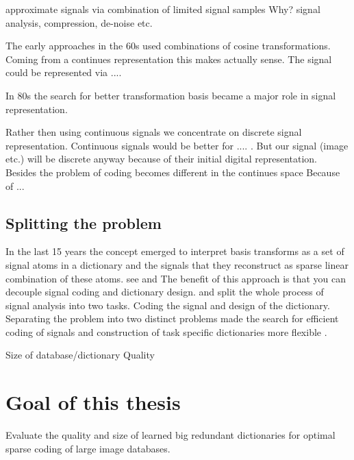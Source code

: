 approximate signals via combination of limited signal samples
Why?
signal analysis, compression, de-noise etc.

The early approaches in the 60s used combinations of cosine transformations. Coming from a continues representation this makes 
actually sense. The signal could be represented via ....

In 80s the search for better transformation basis became a major role in signal representation. \cite{}

Rather then using continuous signals we concentrate on discrete signal representation.
Continuous signals would be better for .... . But our signal (image etc.) will be discrete anyway because of their initial digital representation. 
Besides the problem of coding becomes different in the continues space \cite{} Because of ...

\subsection{Splitting the problem}
\cite{Rubinstein2010}
In the last 15 years the concept emerged to interpret basis transforms as a set of signal atoms in a dictionary and the signals 
that they reconstruct as sparse linear combination of these atoms.
see \cite{Olshausen1996} and \cite{}
The benefit of this approach is that you can decouple signal coding and dictionary design.
and split the whole process of signal analysis into two tasks. Coding the signal and design of the dictionary.
Separating the problem into two distinct problems made the search for efficient coding of signals and construction of task specific dictionaries more flexible \cite{?}.



Size of database/dictionary
Quality





\section{Goal of this thesis}
Evaluate the quality and size of learned big redundant dictionaries for 
optimal sparse coding of large image databases.

